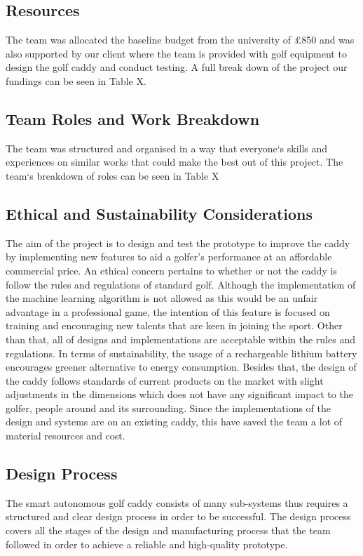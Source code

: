 \documentclass[11pt,landscape]{article}
\begin{document}
\begin{multicols}{3}
\subsection{Resources}
The team was allocated the baseline budget from the university of £850 and was
also supported by our client where the team is provided with golf equipment to
design the golf caddy and conduct testing. A full break down of the project our
fundings can be seen in Table X. 

\subsection{Team Roles and Work Breakdown}
The team was structured and organised in a way that everyone`s skills and
experiences on similar works that could make the best out of this project. The
team`s breakdown of roles can be seen in Table X 

\subsection{Ethical and Sustainability Considerations}
The aim of the project is to design and test the prototype to improve the caddy
by implementing new features to aid a golfer’s performance at an affordable
commercial price. An ethical concern pertains to whether or not the caddy is
follow the rules and regulations of standard golf. Although the implementation
of the machine learning algorithm is not allowed as this would be an unfair
advantage in a professional game, the intention of this feature is focused on
training and encouraging new talents that are keen in joining the sport. Other
than that, all of designs and implementations are acceptable within the rules
and regulations. In terms of sustainability, the usage of a rechargeable lithium
battery encourages greener alternative to energy consumption. Besides that, the
design of the caddy follows standards of current products on the market with
slight adjustments in the dimensions which does not have any significant impact
to the golfer, people around and its surrounding. Since the implementations of
the design and systems are on an existing caddy, this have saved the team a lot
of material resources and cost.  

\subsection{Design Process}
The smart autonomous golf caddy consists of many sub-systems thus requires a
structured and clear design process in order to be successful. The design
process covers all the stages of the design and manufacturing process that the
team followed in order to achieve a reliable and high-quality prototype. 


\end{multicols}
\end{document}
